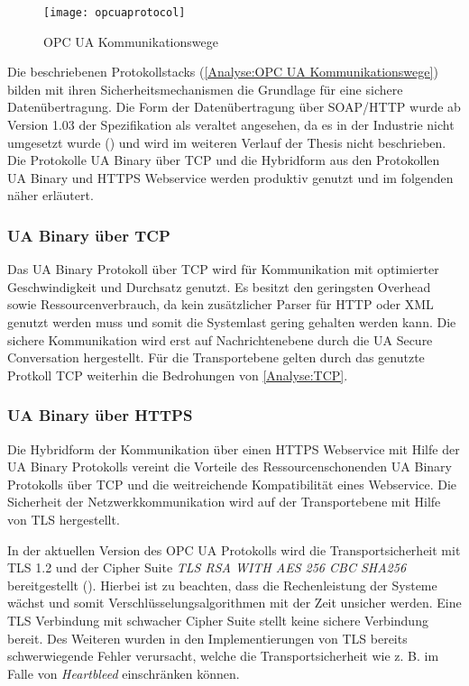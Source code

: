 \begin{figure}[h]
  \centering
  \texttt{[image: opcuaprotocol]}
  \caption{OPC UA Kommunikationswege} 
  \label{Analyse:OPC UA Kommunikationswege}
\end{figure}

Die beschriebenen Protokollstacks (\autoref{Analyse:OPC UA Kommunikationswege}) bilden mit ihren Sicherheitsmechanismen die Grundlage für eine sichere Datenübertragung. Die Form der Datenübertragung über \ac{SOAP}/\ac{HTTP} wurde ab Version 1.03 der Spezifikation als veraltet angesehen, da es in der Industrie nicht umgesetzt wurde (\cite{opcpt5}) und wird im weiteren Verlauf der Thesis nicht beschrieben. Die Protokolle \ac{UA} Binary über \ac{TCP} und die Hybridform aus den Protokollen \ac{UA} Binary und \ac{HTTPS} Webservice werden produktiv genutzt und im folgenden näher erläutert.

\subsubsection{\ac{UA} Binary über \ac{TCP}}
Das \ac{UA} Binary Protokoll über \ac{TCP} wird für Kommunikation mit optimierter Geschwindigkeit und Durchsatz genutzt. Es besitzt den geringsten Overhead sowie Ressourcenverbrauch, da kein zusätzlicher Parser für \ac{HTTP} oder \ac{XML} genutzt werden muss und somit die Systemlast gering gehalten werden kann. Die sichere Kommunikation wird erst auf Nachrichtenebene durch die \ac{UA} Secure Conversation hergestellt. Für die Transportebene gelten durch das genutzte Protkoll \ac{TCP} weiterhin die Bedrohungen von \autoref{Analyse:TCP}.

\subsubsection{\ac{UA} Binary über \ac{HTTPS}}
Die Hybridform der Kommunikation über einen \ac{HTTPS} Webservice mit Hilfe der \ac{UA} Binary Protokolls vereint die Vorteile des Ressourcenschonenden \ac{UA} Binary Protokolls über \ac{TCP} und die weitreichende Kompatibilität eines Webservice. Die Sicherheit der Netzwerkkommunikation wird auf der Transportebene mit Hilfe von \ac{TLS} hergestellt.

In der aktuellen Version des \ac{OPC UA} Protokolls wird die Transportsicherheit mit \ac{TLS} 1.2 und der Cipher Suite \textit{TLS RSA WITH AES 256 CBC SHA256} bereitgestellt (\cite{opcpt7}). Hierbei ist zu beachten, dass die Rechenleistung der Systeme wächst und somit Verschlüsselungsalgorithmen mit der Zeit unsicher werden. Eine \ac{TLS} Verbindung mit schwacher Cipher Suite stellt keine sichere Verbindung bereit. Des Weiteren wurden in den Implementierungen von \ac{TLS} bereits schwerwiegende Fehler verursacht, welche die Transportsicherheit wie z. B. im Falle von \textit{Heartbleed} einschränken können.

